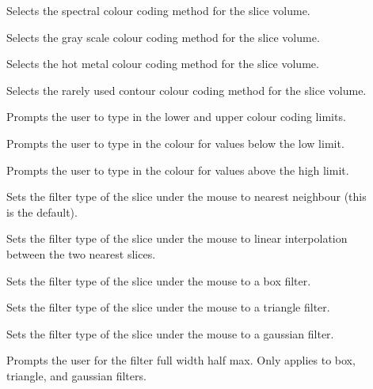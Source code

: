 \begin{description}
\item[]  Selects the spectral colour coding
                                          method for the slice volume.
\item[]  Selects the gray scale colour coding
                                          method for the slice volume.
\item[]  Selects the hot metal colour coding
                                          method for the slice volume.
\item[]  Selects the rarely used contour
                                    colour coding method for the slice volume.
\item[]  Prompts the user to type in the lower
                                    and upper colour coding limits.
\item[]  Prompts the user to type in
                                   the colour for values below the low limit.
\item[]  Prompts the user to type in
                                   the colour for values above the high limit.
\item[]  Sets the filter type of
                       the slice under the mouse to nearest neighbour (this is
                       the default).
\item[]  Sets the filter type of
                       the slice under the mouse to linear interpolation
                       between the two nearest slices.
\item[]  Sets the filter type of
                       the slice under the mouse to a box filter.
\item[]  Sets the filter type of
                       the slice under the mouse to a triangle filter.
\item[]  Sets the filter type of
                       the slice under the mouse to a gaussian filter.
\item[]  Prompts the user for
                      the filter full width half max.  Only applies to box,
                      triangle, and gaussian filters.

\end{description}
